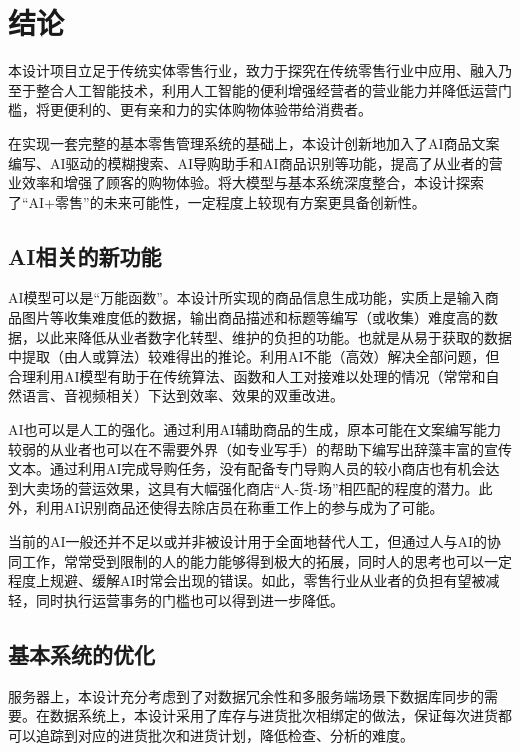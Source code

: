 \newpage
\section{结论}

本设计项目立足于传统实体零售行业，致力于探究在传统零售行业中应用、融入乃至于整合人工智能技术，利用人工智能的便利增强经营者的营业能力并降低运营门槛，将更便利的、更有亲和力的实体购物体验带给消费者。

在实现一套完整的基本零售管理系统的基础上，本设计创新地加入了AI商品文案编写、AI驱动的模糊搜索、AI导购助手和AI商品识别等功能，提高了从业者的营业效率和增强了顾客的购物体验。将大模型与基本系统深度整合，本设计探索了“AI+零售”的未来可能性，一定程度上较现有方案更具备创新性。

\subsection{AI相关的新功能}

AI模型可以是“万能函数”。本设计所实现的商品信息生成功能，实质上是输入商品图片等收集难度低的数据，输出商品描述和标题等编写（或收集）难度高的数据，以此来降低从业者数字化转型、维护的负担的功能。也就是从易于获取的数据中提取（由人或算法）较难得出的推论。利用AI不能（高效）解决全部问题，但合理利用AI模型有助于在传统算法、函数和人工对接难以处理的情况（常常和自然语言、音视频相关）下达到效率、效果的双重改进。

AI也可以是人工的强化。通过利用AI辅助商品的生成，原本可能在文案编写能力较弱的从业者也可以在不需要外界（如专业写手）的帮助下编写出辞藻丰富的宣传文本。通过利用AI完成导购任务，没有配备专门导购人员的较小商店也有机会达到大卖场的营运效果，这具有大幅强化商店“人-货-场”相匹配的程度的潜力。此外，利用AI识别商品还使得去除店员在称重工作上的参与成为了可能。

当前的AI一般还并不足以或并非被设计用于全面地替代人工，但通过人与AI的协同工作，常常受到限制的人的能力能够得到极大的拓展，同时人的思考也可以一定程度上规避、缓解AI时常会出现的错误。如此，零售行业从业者的负担有望被减轻，同时执行运营事务的门槛也可以得到进一步降低。

\subsection{基本系统的优化}

服务器上，本设计充分考虑到了对数据冗余性和多服务端场景下数据库同步的需要。在数据系统上，本设计采用了库存与进货批次相绑定的做法，保证每次进货都可以追踪到对应的进货批次和进货计划，降低检查、分析的难度。

